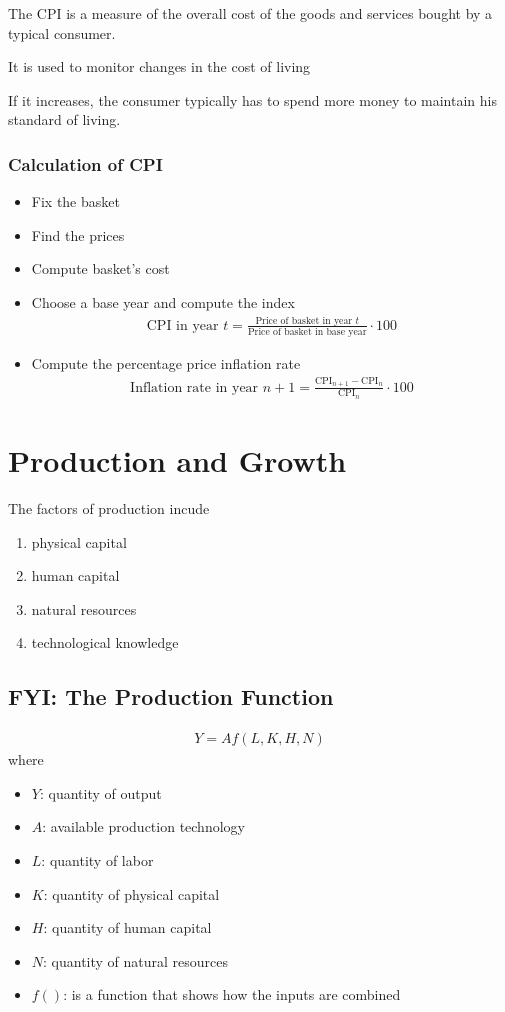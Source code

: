 \documentclass[a4paper,titlepage] {scrartcl}
\begin{document}
The CPI is a measure of the overall cost of the goods and services bought by a typical consumer. 

It is used to monitor changes in the cost of living

If it increases, the consumer typically has to spend more money to maintain his standard of living.

\subsubsection{Calculation of CPI}
\begin{itemize}
	\item Fix the basket
	\item Find the prices
	\item Compute basket's cost
	\item Choose a base year and compute the index
	\begin{eqnarray*}
		\text{CPI in year }t
		=
		\frac{\text{Price of basket in year }t}
		{\text{Price of basket in base year}}
		\cdot 100
	\end{eqnarray*}
	\item Compute the percentage price inflation  rate
	\begin{eqnarray*}
		\text{Inflation rate in year }n+1
		=
		\frac{\text{CPI}_{n+1}-\text{CPI}_n}
		{\text{CPI}_n}
		\cdot 100
	\end{eqnarray*}
\end{itemize}

\section{Production and Growth}
The factors of production incude
\begin{enumerate}
	\item physical capital
	\item human capital
	\item natural resources
	\item technological knowledge
\end{enumerate}
\subsection{FYI: The Production Function}
\begin{eqnarray*}
	\boxed{
	Y = A f(L,K,H,N)
	}
\end{eqnarray*}
where
\begin{itemize}
	\item $Y$: quantity of output
	\item $A$: available production technology	
	\item $L$: quantity of labor
	\item $K$: quantity of physical capital
	\item $H$: quantity of human capital
	\item $N$: quantity of natural resources
	\item $f()$: is a function that shows how the inputs are combined	
	
\end{itemize}
\end{document}
